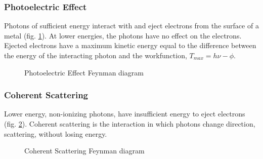 \subsubsection{Photoelectric Effect}

Photons of sufficient energy interact with and eject electrons from the surface of a metal (fig. \ref{fig:photoelectric}).  At lower energies, the photons have no effect on the electrons.  Ejected electrons have a maximum kinetic energy equal to the difference between the energy of the interacting photon and the workfunction, $T_{max} = h \nu - \phi$.

\begin{figure}[h]
\begin{center}
\end{center}
\caption{Photoelectric Effect Feynman diagram}
\label{fig:photoelectric}
\end{figure}



\subsubsection{Coherent Scattering}

Lower energy, non-ionizing photons, have insufficient energy to eject electrons (fig. \ref{fig:coherentscattering}).  Coherent scattering is the interaction in which photons change direction, scattering, without losing energy. 


\begin{figure}[h]
\begin{center}
\end{center}
\caption{Coherent Scattering Feynman diagram}
\label{fig:coherentscattering}
\end{figure}

